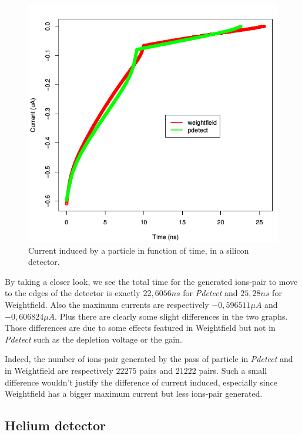 \documentclass[11pt]{article}
\begin{document}
			\begin{figure}[H]
			  \center
			  \includegraphics[scale=0.5]{images/applications/silicon_current.png}
			  \caption{Current induced by a particle in function of time, in a silicon detector.}
			  \label{fig:silicon}
			\end{figure}

			By taking a closer look, we see the total time for the generated ions-pair to move to the edges of the
			detector is exactly $22,6056ns$ for \textit{Pdetect} and $25,28ns$ for Weightfield. Also the maximum 
			currents are respectively $-0,596511\mu A$ and $-0,606824\mu A$. Plus there are clearly some slight 
			differences in the two graphs. Those differences are due to some effects featured in Weightfield
			but not in \textit{Pdetect} such as the depletion voltage or the gain.

			Indeed, the number of ions-pair generated by the pass of particle in \textit{Pdetect} and in Weightfield
			are respectively $22275$ pairs and $21222$ pairs. Such a small difference wouldn't justify the difference
			of current induced, especially since Weightfield has a bigger maximum current but less ions-pair generated.

	\subsection{Helium detector}
\end{document}
